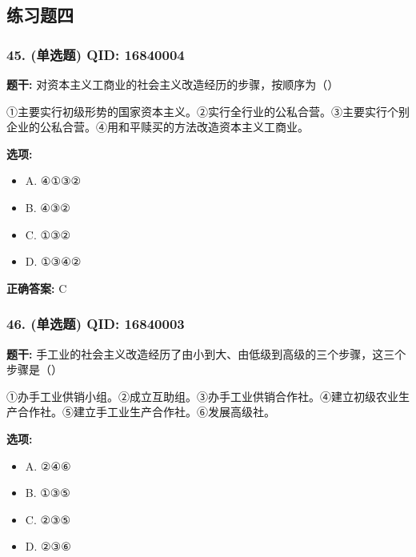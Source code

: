 \documentclass[12pt,UTF8]{ctexart}
\begin{document}
\subsection*{练习题四}

\subsubsection*{45. (单选题) \small QID: 16840004}

\textbf{题干:}
对资本主义工商业的社会主义改造经历的步骤，按顺序为（）
\par
①主要实行初级形势的国家资本主义。②实行全行业的公私合营。③主要实行个别企业的公私合营。④用和平赎买的方法改造资本主义工商业。

\textbf{选项:}
\begin{itemize}[leftmargin=*]

  \item A. ④①③②

  \item B. ④③②

  \item C. ①③②

  \item D. ①③④②

\end{itemize}

\textbf{正确答案:}
C

\vspace{0.3em}\hrulefill\vspace{0.7em}

\subsubsection*{46. (单选题) \small QID: 16840003}

\textbf{题干:}
手工业的社会主义改造经历了由小到大、由低级到高级的三个步骤，这三个步骤是（）
\par
①办手工业供销小组。②成立互助组。③办手工业供销合作社。④建立初级农业生产合作社。⑤建立手工业生产合作社。⑥发展高级社。

\textbf{选项:}
\begin{itemize}[leftmargin=*]

  \item A. ②④⑥

  \item B. ①③⑤

  \item C. ②③⑤

  \item D. ②③⑥

\end{itemize}
\end{document}
